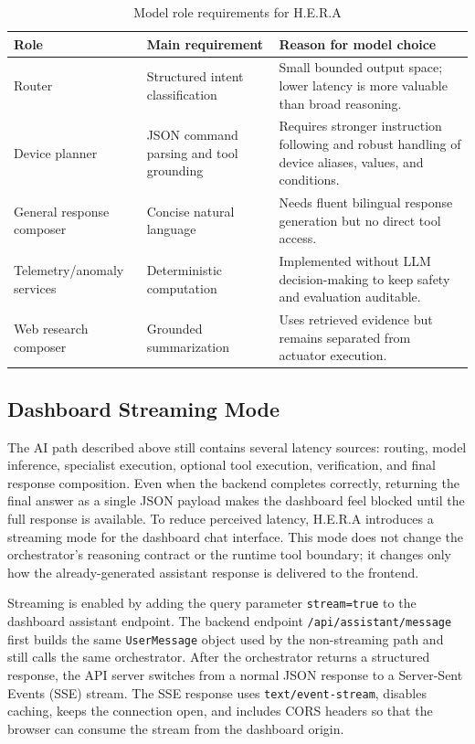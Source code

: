 \begin{table}[H]
    \centering
    \caption{Model role requirements for H.E.R.A}
    \label{tab:hera-model-role-requirements}
    \renewcommand{\arraystretch}{1.16}
    \begin{tabularx}{\textwidth}{@{}p{3.1cm}p{3.3cm}X@{}}
        \toprule
        \textbf{Role} & \textbf{Main requirement} & \textbf{Reason for model choice} \\
        \midrule
        Router & Structured intent classification & Small bounded output space; lower latency is more valuable than broad reasoning. \\
        Device planner & JSON command parsing and tool grounding & Requires stronger instruction following and robust handling of device aliases, values, and conditions. \\
        General response composer & Concise natural language & Needs fluent bilingual response generation but no direct tool access. \\
        Telemetry/anomaly services & Deterministic computation & Implemented without LLM decision-making to keep safety and evaluation auditable. \\
        Web research composer & Grounded summarization & Uses retrieved evidence but remains separated from actuator execution. \\
        \bottomrule
    \end{tabularx}
\end{table}

\subsection{Dashboard Streaming Mode}

The AI path described above still contains several latency sources: routing, model inference, specialist execution, optional tool execution, verification, and final response composition. Even when the backend completes correctly, returning the final answer as a single JSON payload makes the dashboard feel blocked until the full response is available. To reduce perceived latency, H.E.R.A introduces a streaming mode for the dashboard chat interface. This mode does not change the orchestrator's reasoning contract or the runtime tool boundary; it changes only how the already-generated assistant response is delivered to the frontend.

Streaming is enabled by adding the query parameter \texttt{stream=true} to the dashboard assistant endpoint. The backend endpoint \texttt{/api/assistant/message} first builds the same \texttt{UserMessage} object used by the non-streaming path and still calls the same orchestrator. After the orchestrator returns a structured response, the API server switches from a normal JSON response to a Server-Sent Events (SSE) stream. The SSE response uses \texttt{text/event-stream}, disables caching, keeps the connection open, and includes CORS headers so that the browser can consume the stream from the dashboard origin.

